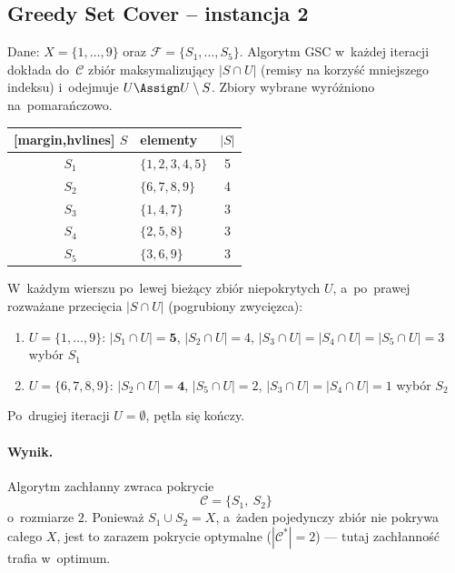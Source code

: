 \subsection{Greedy Set Cover -- instancja 2}

Dane: $X = \{1, \ldots, 9\}$ oraz $\mathcal{F} = \{S_1, \ldots, S_5\}$.
Algorytm \textsc{GSC} w~każdej iteracji dokłada do~$\mathcal{C}$ zbiór
maksymalizujący $|S \cap U|$ (remisy na korzyść mniejszego indeksu) i~odejmuje
$U \Assign U \setminus S$. Zbiory wybrane wyróżniono na~\textcolor{accentB}{pomarańczowo}.

\begin{aztable}
	\centering
	\renewcommand{\arraystretch}{1.2}
	\begin{NiceTabular}{c|l|c}[margin,hvlines]
		$S$                  & elementy                & $|S|$ \\
		\hline
		\color{accentB}$S_1$ & \color{accentB}$\{1,2,3,4,5\}$ & \color{accentB}5 \\
		\color{accentB}$S_2$ & \color{accentB}$\{6,7,8,9\}$   & \color{accentB}4 \\
		$S_3$                & $\{1,4,7\}$             & 3 \\
		$S_4$                & $\{2,5,8\}$             & 3 \\
		$S_5$                & $\{3,6,9\}$             & 3
	\end{NiceTabular}
\end{aztable}

\begin{dygresja}
	W~każdym wierszu po~lewej bieżący zbiór niepokrytych $U$, a~po~prawej
	rozważane przecięcia $|S \cap U|$ (pogrubiony zwycięzca):
	\begin{enumerate}[nosep]
		\item $U = \{1,\ldots,9\}$:\quad
		      $|S_1 \cap U| = \mathbf{5}$, $|S_2 \cap U| = 4$,
		      $|S_3 \cap U| = |S_4 \cap U| = |S_5 \cap U| = 3$
		      \hfill wybór $S_1$
		\item $U = \{6,7,8,9\}$:\quad
		      $|S_2 \cap U| = \mathbf{4}$, $|S_5 \cap U| = 2$,
		      $|S_3 \cap U| = |S_4 \cap U| = 1$
		      \hfill wybór $S_2$
	\end{enumerate}
	Po~drugiej iteracji $U = \emptyset$, pętla się kończy.
\end{dygresja}

\paragraph{Wynik.}
Algorytm zachłanny zwraca pokrycie
\[
	\boxed{\mathcal{C} = \{S_1,\ S_2\}}
\]
o~rozmiarze $2$. Ponieważ $S_1 \cup S_2 = X$, a~żaden pojedynczy zbiór nie pokrywa
całego $X$, jest to zarazem pokrycie optymalne ($|\mathcal{C}^*| = 2$) --- tutaj
zachłanność trafia w~optimum.

